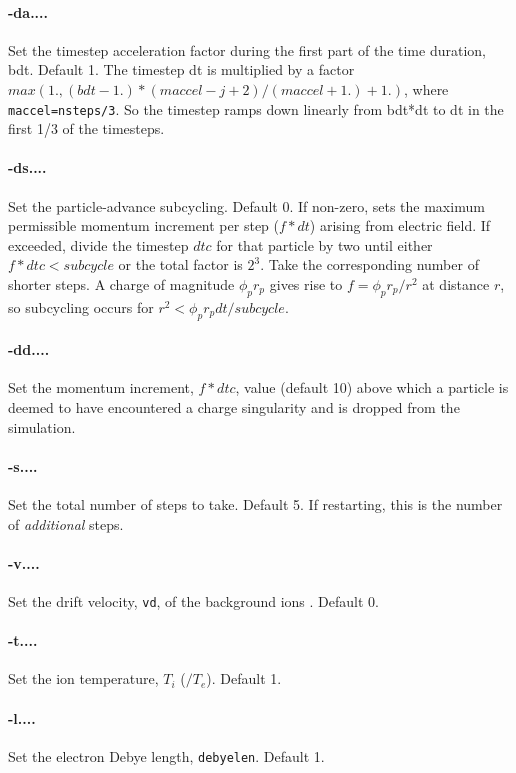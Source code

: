 \documentclass[12pt]{article}
\begin{document}
\paragraph{-da....}
 Set the timestep acceleration factor during the first part of
 the time duration, bdt. Default 1. The timestep dt is multiplied by a
 factor $max(1.,(bdt-1.)*(maccel-j+2)/(maccel+1.)+1.)$, where
 \verb!maccel=nsteps/3!.  So the timestep ramps down linearly from bdt*dt to
 dt in the first 1/3 of the timesteps.

\paragraph{-ds....}
Set the particle-advance subcycling. Default 0.  If non-zero, sets the
maximum permissible momentum increment per step ($f*dt$) arising from
electric field. If exceeded, divide the timestep $dtc$ for that
particle by two until either $f*dtc<subcycle$ or the total factor is
$2^3$. Take the corresponding number of shorter steps. A charge of
magnitude $\phi_pr_p$ gives rise to $f=\phi_pr_p/r^2$ at distance $r$,
so subcycling occurs for $r^2<\phi_pr_pdt/subcycle$.

\paragraph{-dd....}
Set the momentum increment, $f*dtc$, value (default 10) above which a
particle is deemed to have encountered a charge singularity and is
dropped from the simulation.

\paragraph{-s....}
Set the total number of steps to take. Default 5. 
If restarting, this is the number of \emph{additional} steps. 

\paragraph{-v....}  Set the drift velocity, \verb!vd!, of the background ions . Default 0.

\paragraph{-t....}  Set the ion temperature, $T_i$ ($/T_e$). Default 1.

\paragraph{-l....}  Set the electron Debye length, \verb!debyelen!. Default 1.
\end{document}
